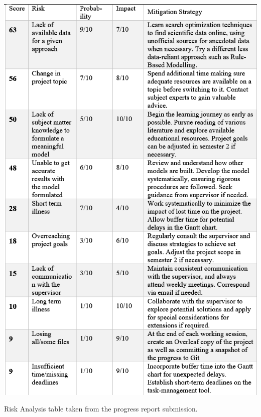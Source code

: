 \begin{table}[!htb]
    \includegraphics[width=14cm,center]{Figures/RiskTable2.png}
    \caption{Risk Analysis table taken from the progress report submission.}
    \label{Figure:RiskTable}
\end{table}
